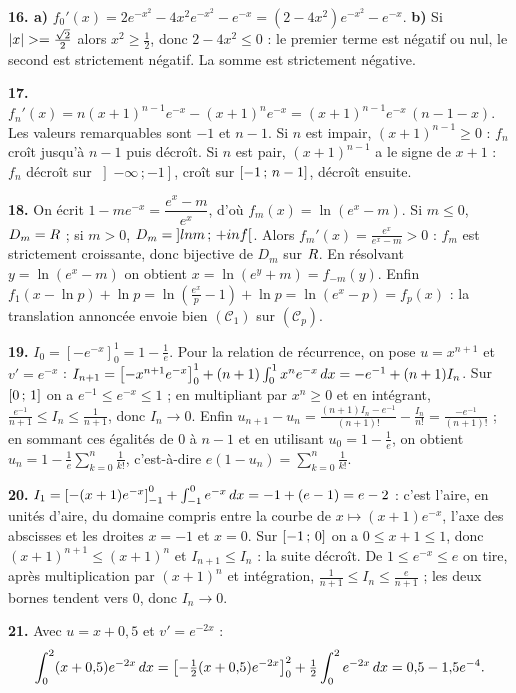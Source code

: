 \begin{corrige}[annales]
\textbf{16. a)} $f_{0}'(x) = 2e^{-x^{2}}-4x^{2}e^{-x^{2}}-e^{-x}
= \left(2-4x^{2}\right)e^{-x^{2}}-e^{-x}$.
\textbf{b)} Si $\left|x\right| >= \frac{\sqrt2}{2}$ alors $x^{2}\geq\frac12$, donc
$2-4x^{2} \leq 0$ : le premier terme est négatif ou nul, le second est
strictement négatif. La somme est strictement négative.

\textbf{17.} $f_{n}'(x) = n(x+1)^{n-1}e^{-x}-(x+1)^{n}e^{-x}
= (x+1)^{n-1}e^{-x}\,(n-1-x)$. Les valeurs remarquables sont $-1$ et $n-1$.
Si $n$ est impair, $(x+1)^{n-1}\geq0$ : $f_{n}$ croît jusqu'à $n-1$ puis
décroît. Si $n$ est pair, $(x+1)^{n-1}$ a le signe de $x+1$ : $f_{n}$ décroît
sur $\left]-\infty\,;-1\right]$, croît sur $\left[-1\,;\,n-1\right]$, décroît
ensuite.

\textbf{18.} On écrit $1-me^{-x} = \dfrac{e^{x}-m}{e^{x}}$, d'où
$f_{m}(x) = \ln\!\left(e^{x}-m\right)$. Si $m \leq 0$, $D_{m} = R$ ; si
$m>0$, $D_{m} = \left]ln m\,;\,+inf\right[$. Alors
$f_{m}'(x) = \frac{e^{x}}{e^{x}-m}>0$ : $f_{m}$ est strictement croissante,
donc bijective de $D_{m}$ sur $R$. En résolvant $y = \ln(e^{x}-m)$ on obtient
$x = \ln\!\left(e^{y}+m\right) = f_{-m}(y)$. Enfin
$f_{1}(x-\ln p)+\ln p = \ln\!\left(\frac{e^{x}}{p}-1\right)+\ln p
= \ln\!\left(e^{x}-p\right) = f_{p}(x)$ : la translation annoncée envoie bien
$(\mathcal C_{1})$ sur $(\mathcal C_{p})$.

\textbf{19.} $I_{0} = \left[-e^{-x}\right]_{0}^{1} = 1-\frac1e$. Pour la
relation de récurrence, on pose $u = x^{n+1}$ et $v' = e^{-x}$ :
$I_{n+1} = \left[-x^{n+1}e^{-x}\right]_{0}^{1}
+(n+1)\int_{0}^{1}x^{n}e^{-x}\,dx = -e^{-1}+(n+1)I_{n}$. Sur
$\left[0\,;\,1\right]$ on a $e^{-1} \leq e^{-x} \leq 1$ ; en multipliant par
$x^{n}\geq0$ et en intégrant, $\frac{e^{-1}}{n+1} \leq I_{n} \leq
\frac{1}{n+1}$, donc $I_{n}\to0$. Enfin
$u_{n+1}-u_{n} = \frac{(n+1)I_{n}-e^{-1}}{(n+1)!}-\frac{I_{n}}{n!}
= \frac{-e^{-1}}{(n+1)!}$ ; en sommant ces égalités de $0$ à $n-1$ et en
utilisant $u_{0} = 1-\frac1e$, on obtient
$u_{n} = 1-\frac1e\sum_{k=0}^{n}\frac{1}{k!}$, c'est-à-dire
$e\left(1-u_{n}\right) = \sum_{k=0}^{n}\frac{1}{k!}$.

\textbf{20.} $I_{1} = \left[-(x+1)e^{-x}\right]_{-1}^{0}
+\int_{-1}^{0}e^{-x}\,dx = -1+(e-1) = e-2$ : c'est l'aire, en unités d'aire,
du domaine compris entre la courbe de $x\mapsto(x+1)e^{-x}$, l'axe des
abscisses et les droites $x = -1$ et $x = 0$. Sur $\left[-1\,;\,0\right]$ on a
$0 \leq x+1 \leq 1$, donc $(x+1)^{n+1} \leq (x+1)^{n}$ et
$I_{n+1} \leq I_{n}$ : la suite décroît. De $1 \leq e^{-x} \leq e$ on tire,
après multiplication par $(x+1)^{n}$ et intégration,
$\frac{1}{n+1} \leq I_{n} \leq \frac{e}{n+1}$ ; les deux bornes tendent vers
$0$, donc $I_{n}\to0$.

\textbf{21.} Avec $u = x+0{,}5$ et $v' = e^{-2x}$ :
\[
  \int_{0}^{2}(x+0{,}5)e^{-2x}\,dx
  = \left[-\tfrac12(x+0{,}5)e^{-2x}\right]_{0}^{2}
  +\tfrac12\int_{0}^{2}e^{-2x}\,dx
  = 0{,}5-1{,}5e^{-4}.
\]
\end{corrige}

